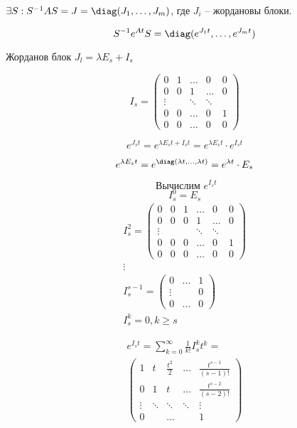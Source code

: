 \documentclass[a4paper]{article}
\theoremstyle{indented}
\theoremstyle{definition}
\theoremstyle{remark}
\begin{document}
$\exists S: S^{-1}AS = J = \diag (J_1,\ldots,J_m)$, где $J_i$ -- жордановы блоки.

\[S^{-1}e^{At}S = \diag(e^{J_1t},\ldots, e^{J_mt})\]

Жорданов блок $J_l = \lambda E_s +I_s$

\[I_s = \begin{pmatrix}
    0 & 1 & \ldots & 0 & 0 \\
    0 & 0 & 1 & \ldots & 0 \\
    \vdots & & \ddots & \ddots & \\
    0 & 0 & \ldots & 0 & 1\\
    0 & 0 & \ldots & 0 & 0
  \end{pmatrix}\]

\[e^{J_st} = e^{\lambda E_st + I_st} = e^{\lambda E_s t} \cdot e^{I_s t}\]

\[e^{\lambda E_s t} = e^{\diag(\lambda t, \ldots, \lambda t)} = e^{\lambda t} \cdot E_s \]

\[\text{ Вычислим }e^{I_s t} \]
\[I_s^0 = E_s\]
\begin{equation*}
  \begin{gathered}
    I_s^2 = \begin{pmatrix}
      0 & 0 & 1 & \ldots & 0 & 0 \\
      0 & 0 & 0 & 1 & \ldots & 0 \\
      \vdots & & &\ddots & \ddots & \\
      0 & 0 & 0 &\ldots & 0 & 1\\
      0 & 0 & 0 &\ldots & 0 & 0
    \end{pmatrix} \\
    \vdots \\
    I_s^{s-1} =
    \begin{pmatrix}
      0 & \ldots & 1 \\
      \vdots & & 0 \\
      0 & \ldots & 0
    \end{pmatrix}
    \\
     I_s^k = 0, k \geqslant s
  \end{gathered}
\end{equation*}

\begin{equation*}
  \begin{gathered}
    e^{I_s t} = \sum_{k = 0}^{\infty} \frac{1}{k!}I_s^k t^k 
    =\\
    \begin{pmatrix}
      1 & t & \frac{t^2}{2} & \ldots & \frac{t^{s-1}}{(s-1)!} \\
      0 & 1 & t & \ldots & \frac{t^{s-2}}{(s-2)!}\\
      \vdots & \ddots & \ddots & \ddots & \vdots \\
      0 & & \ldots & & 1
    \end{pmatrix}
  \end{gathered}
\end{equation*}
\end{document}
